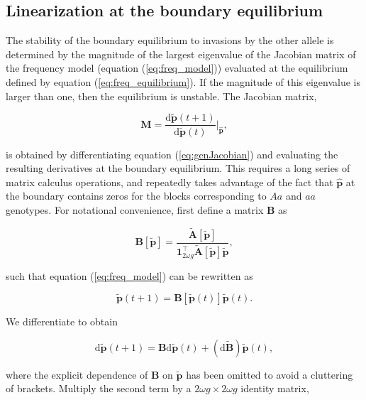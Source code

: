\documentclass[11pt]{article}
\def\mbf#1{\mathbf{#1}}
\begin{document}
\subsection{Linearization at the boundary equilibrium}

The stability of the boundary equilibrium to invasions by the other allele is determined by the magnitude of the largest eigenvalue of the Jacobian matrix of the frequency model (equation (\ref{eq:freq_model})) evaluated at the equilibrium defined by equation (\ref{eq:freq_equilibrium}). If the magnitude of this eigenvalue is larger than one, then the equilibrium is unstable. The Jacobian matrix,

\begin{equation} \label{eq:genJacobian}
	\mbf{M} =  \frac{ \text{d} \tilde{\mbf{p}}(t + 1) }{ \text{d} \tilde{\mbf{p}}(t) } \bigg\rvert_{\hat{\mbf{p}}},
\end{equation}

\noindent is obtained by differentiating equation (\ref{eq:genJacobian}) and evaluating the resulting derivatives at the boundary equilibrium. This requires a long series of matrix calculus operations, and repeatedly takes advantage of the fact that $\hat{\mbf{p}}$ at the boundary contains zeros for the blocks corresponding to $Aa$ and $aa$ genotypes.
\newpage
For notational convenience, first define a matrix $\mbf{B}$ as

\begin{equation}
	\mbf{B}[\tilde{\mbf{p}}] = \frac{ \tilde{\mbf{A}}[\tilde{\mbf{p}}] }{ \mbf{1}^{\intercal}_{2 \omega g} \tilde{\mbf{A}}[\tilde{\mbf{p}}] \tilde{\mbf{p}}}, 
\end{equation}

\noindent such that equation (\ref{eq:freq_model}) can be rewritten as

\begin{equation} 
	\tilde{\mbf{p}}(t + 1) = \mbf{B}[\tilde{\mbf{p}}(t)]\tilde{\mbf{p}}(t).
\end{equation}

\noindent We differentiate to obtain

\begin{equation} 
	\text{d} \tilde{\mbf{p}}(t + 1) = \mbf{B}\text{d} \tilde{\mbf{p}}(t) + \left(\text{d} \tilde{\mbf{B}} \right) \tilde{\mbf{p}}(t),
\end{equation}

\noindent where the explicit dependence of $\mbf{B}$ on $\tilde{\mbf{p}}$ has been omitted to avoid a cluttering of brackets. Multiply the second term by a $2 \omega g \times 2 \omega g$ identity matrix,
\end{document}
